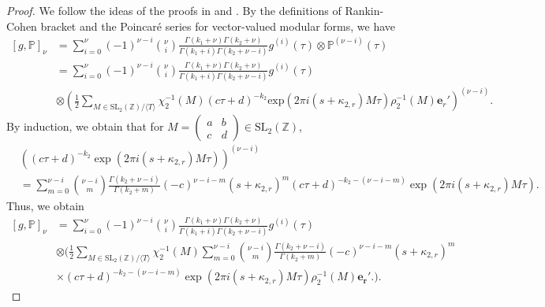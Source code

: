\documentclass[11pt]{amsart}
\theoremstyle{definition}
\theoremstyle{remark}
\numberwithin{equation}{section}
\newcommand{\sm}{\left(\begin{smallmatrix}}
\newcommand{\esm}{\end{smallmatrix}\right)}
\renewcommand{\(}{\left(}
\renewcommand{\)}{\right)}
\begin{document}
\begin{proof}
    We follow the ideas of the proofs in \cite[Lemma 4.3]{NX} and \cite[Proposition 2.2]{CKZ}.
    By the definitions of Rankin-Cohen bracket and the Poincar\'e series for vector-valued modular forms, we have
    \begin{equation*}
        \begin{aligned}
            [g,\mathbb{P}]_{\nu}&=\sum_{i=0}^{\nu}(-1)^{\nu-i} \binom{\nu}{i} \frac{\Gamma(k_1+\nu)\Gamma(k_2+\nu)}{\Gamma(k_1+i)\Gamma(k_2+\nu-i)}g^{(i)}(\tau)\otimes \mathbb{P}^{(\nu-i)}(\tau)\\
            &=\sum_{i=0}^{\nu}(-1)^{\nu-i}\binom{\nu}{i}\frac{\Gamma(k_1+\nu)\Gamma(k_2+\nu)}{\Gamma(k_1+i)\Gamma(k_2+\nu-i)}g^{(i)}(\tau)\\
            &\otimes \left(\frac{1}{2} \sum_{M\in \mathrm{SL}_{2}(\mathbb{Z})/\langle T \rangle } \chi_2^{-1}(M)(c\tau+d)^{-k_2}\mathrm{exp}(2\pi i(s+\kappa_{2,r})M\tau)\rho_2^{-1}(M)\mathbf{e}_{r}' \right)^{(\nu-i)}.
        \end{aligned}
    \end{equation*}
    By induction, we obtain that for $M=\sm a & b\\
    c & d \esm\in \mathrm{SL}_{2}(\mathbb{Z})$, 
    \begin{equation*}
        \begin{aligned}
            &\left((c\tau+d)^{-k_2}\exp(2\pi i (s+\kappa_{2,r})M\tau)\right)^{(\nu-i)}\\
            &=\sum_{m=0}^{\nu-i}\binom{\nu-i}{m}\frac{\Gamma(k_2+\nu-i)}{\Gamma(k_2+m)}(-c)^{\nu-i-m}(s+\kappa_{2,r})^{m}(c\tau+d)^{-k_2-(\nu-i-m)}\exp(2\pi i (s+\kappa_{2,r})M\tau).
        \end{aligned}
    \end{equation*}
    Thus, we obtain
    \begin{equation*}
        \begin{aligned}
            [g,\mathbb{P}]_{\nu}&=\sum_{i=0}^{\nu}(-1)^{\nu-i}\binom{\nu}{i}\frac{\Gamma(k_1+\nu)\Gamma(k_2+\nu)}{\Gamma(k_1+i)\Gamma(k_2+\nu-i)}g^{(i)}(\tau)\\
            &\otimes \bigg(\frac{1}{2} \sum_{M\in \mathrm{SL}_{2}(\mathbb{Z})/\langle T \rangle } \chi_2^{-1}(M) \sum_{m=0}^{\nu-i} \binom{\nu-i}{m}\frac{\Gamma(k_2+\nu-i)}{\Gamma(k_2+m)}(-c)^{\nu-i-m}(s+\kappa_{2,r})^{m}\\
            &\times (c\tau+d)^{-k_2-(\nu-i-m)}\exp(2\pi i (s+\kappa_{2,r})M\tau)\rho_2^{-1}(M)\mathbf{e_r'}.  \bigg).
        \end{aligned}

\end{equation*}
\end{proof}
\end{document}
